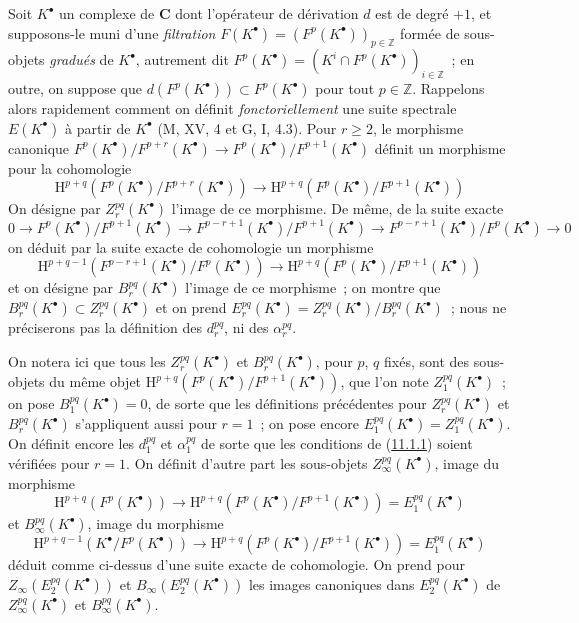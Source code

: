 \begin{env}[11.2.2]
\label{0.11.2.2-fr}
Soit $K^\bullet$ un complexe de $\boldsymbol{C}$ dont l'opérateur de dérivation
$d$ est de degré $+1$, et supposons-le muni d'une \emph{filtration}
$F(K^\bullet)=(F^p(K^\bullet))_{p\in\mathbb Z}$ formée de sous-
objets \emph{gradués} de $K^\bullet$, autrement dit
$F^p(K^\bullet)=(K^i\cap F^p(K^\bullet))_{i\in\mathbb Z}$~; en outre, on
suppose que $d(F^p(K^\bullet))\subset F^p(K^\bullet)$ pour tout
$p\in\mathbb Z$. Rappelons alors rapidement comment on définit
\emph{fonctoriellement} une suite spectrale $E(K^\bullet)$ à partir de
$K^\bullet$ (M, XV, 4 et G, I, 4.3). Pour $r\geq2$, le morphisme canonique
$F^p(K^\bullet)/F^{p+r}(K^\bullet)\to
F^p(K^\bullet)/F^{p+1}(K^\bullet)$ définit un morphisme pour la cohomologie
\[
  \mathrm H^{p+q}(F^p(K^\bullet)/F^{p+r}(K^\bullet))
  \longrightarrow
  \mathrm H^{p+q}(F^p(K^\bullet)/F^{p+1}(K^\bullet))
\]
On désigne par $Z_r^{pq}(K^\bullet)$ l'image de ce morphisme. De même, de la
suite exacte
\[
  0\to F^p(K^\bullet)/F^{p+1}(K^\bullet)
  \to F^{p-r+1}(K^\bullet)/F^{p+1}(K^\bullet)
  \to F^{p-r+1}(K^\bullet)/F^p(K^\bullet)\to0
\]
on déduit par la suite exacte de cohomologie un morphisme
\[
  \mathrm H^{p+q-1}(F^{p-r+1}(K^\bullet)/F^p(K^\bullet))
  \longrightarrow
  \mathrm H^{p+q}(F^p(K^\bullet)/F^{p+1}(K^\bullet))
\]
et on désigne par $B_r^{pq}(K^\bullet)$ l'image de ce morphisme~; on montre
que $B_r^{pq}(K^\bullet)\subset Z_r^{pq}(K^\bullet)$ et on prend
$E_r^{pq}(K^\bullet)=Z_r^{pq}(K^\bullet)/B_r^{pq}(K^\bullet)$~; nous ne
préciserons pas la définition des $d_r^{pq}$, ni des $\alpha_r^{pq}$.

On notera ici que tous les $Z_r^{pq}(K^\bullet)$ et
$B_r^{pq}(K^\bullet)$, pour $p$, $q$ fixés, sont des sous-objets du même
objet
$\mathrm H^{p+q}(F^p(K^\bullet)/F^{p+1}(K^\bullet))$, que l'on note
$Z_1^{pq}(K^\bullet)$~; on pose $B_1^{pq}(K^\bullet)=0$, de sorte que les
définitions précédentes pour $Z_r^{pq}(K^\bullet)$ et
$B_r^{pq}(K^\bullet)$ s'appliquent aussi pour $r=1$~; on pose encore
$E_1^{pq}(K^\bullet)=Z_1^{pq}(K^\bullet)$. On définit encore les $d_1^{pq}$
et $\alpha_1^{pq}$ de sorte que les conditions de
(\hyperref[0.11.1.1-fr]{11.1.1}) soient vérifiées pour $r=1$. On définit
d'autre part les sous-objets $Z_\infty^{pq}(K^\bullet)$, image du morphisme
\[
  \mathrm H^{p+q}(F^p(K^\bullet))\longrightarrow
  \mathrm H^{p+q}(F^p(K^\bullet)/F^{p+1}(K^\bullet))
  =E_1^{pq}(K^\bullet)
\]
et $B_\infty^{pq}(K^\bullet)$, image du morphisme
\[
  \mathrm H^{p+q-1}(K^\bullet/F^p(K^\bullet))\longrightarrow
  \mathrm H^{p+q}(F^p(K^\bullet)/F^{p+1}(K^\bullet))
  =E_1^{pq}(K^\bullet)
\]
déduit comme ci-dessus d'une suite exacte de cohomologie. On prend pour
$Z_\infty(E_2^{pq}(K^\bullet))$ et $B_\infty(E_2^{pq}(K^\bullet))$ les
images canoniques dans $E_2^{pq}(K^\bullet)$ de
$Z_\infty^{pq}(K^\bullet)$ et $B_\infty^{pq}(K^\bullet)$.


\end{env}
